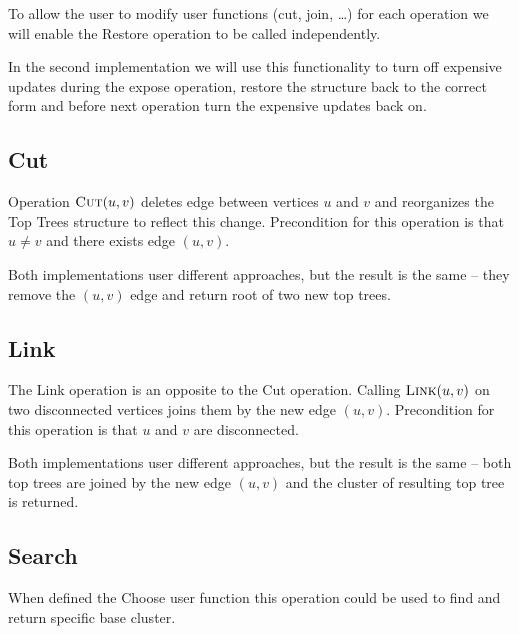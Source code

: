 To allow the user to modify user functions (cut, join, \dots) for each operation
we will enable the Restore operation to be called independently.

In the second implementation we will use this functionality to turn off
expensive updates during the expose operation, restore the structure back to the
correct form and before next operation turn the expensive updates back on.

\subsection{Cut}

Operation $\hbox{\sc Cut}(u,v)$ deletes edge between vertices $u$ and $v$ and reorganizes
the Top Trees structure to reflect this change. Precondition for this operation
is that $u\ne v$ and there exists edge $(u,v)$.

Both implementations user different approaches, but the result is the same --
they remove the $(u,v)$ edge and return root of two new top trees.

\subsection{Link}

The Link operation is an opposite to the Cut operation. Calling $\hbox{\sc Link}(u,v)$ on
two disconnected vertices joins them by the new edge $(u,v)$. Precondition for
this operation is that $u$ and $v$ are disconnected.

Both implementations user different approaches, but the result is the same --
both top trees are joined by the new edge $(u,v)$ and the cluster of resulting
top tree is returned.

\subsection{Search}

When defined the {\I Choose} user function this operation could be used to find
and return specific base cluster.

